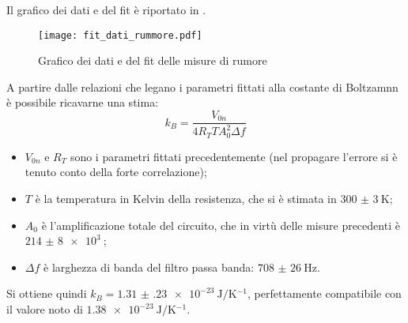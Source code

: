 Il grafico dei dati e del fit è riportato in .

	\begin{figure}[H]
		\centering
		\texttt{[image: fit\_dati\_rummore.pdf]}
		\caption{Grafico dei dati e del fit delle misure di rumore}
		\label{fig:fit_rumore}
	\end{figure}

A partire dalle relazioni che legano i parametri fittati alla costante di Boltzamnn è possibile ricavarne una stima:
$$ k_B = \frac{V_{0n}}{4R_T T A_0^2 \Delta f}$$
\begin{itemize}
	\item $V_{0n}$ e $R_T$ sono i parametri fittati precedentemente (nel propagare l'errore si è tenuto conto della forte correlazione);
	\item $T$ è la temperatura in Kelvin della resistenza, che si è stimata in $\SI{300(3)}{\K}$;
	\item $A_0$ è l'amplificazione totale del circuito, che in virtù delle misure precedenti è $\SI{214(8)e3}{}$;
	\item $\Delta f$ è larghezza di banda del filtro passa banda: $\SI{708(26)}{\hertz}$.
\end{itemize}

Si ottiene quindi $k_B = \SI{1.31(23)e-23}{\J \per \kelvin^{-1}}$, perfettamente compatibile con il valore noto di $\SI{1.38e-23}{\J \per \kelvin^{-1}}$.
